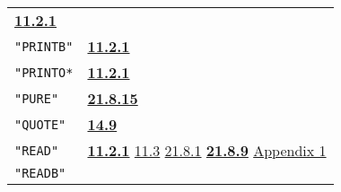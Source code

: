 \documentclass[a4paper,]{article}
\begin{document}
\begin{longtable}[]{@{}ll@{}}
\begin{minipage}[t]{0.70\columnwidth}
\textbf{\href{11-input-output.md\#1121-open}{11.2.1}}\strut
\end{minipage}\tabularnewline
\begin{minipage}[t]{0.24\columnwidth}\raggedright\strut
\texttt{"PRINTB"}\strut
\end{minipage} & \begin{minipage}[t]{0.70\columnwidth}\raggedright\strut
\textbf{\href{11-input-output.md\#1121-open}{11.2.1}}\strut
\end{minipage}\tabularnewline
\begin{minipage}[t]{0.24\columnwidth}\raggedright\strut
\texttt{"PRINTO*}\strut
\end{minipage} & \begin{minipage}[t]{0.70\columnwidth}\raggedright\strut
\textbf{\href{11-input-output.md\#1121-open}{11.2.1}}\strut
\end{minipage}\tabularnewline
\begin{minipage}[t]{0.24\columnwidth}\raggedright\strut
\texttt{"PURE"}\strut
\end{minipage} & \begin{minipage}[t]{0.70\columnwidth}\raggedright\strut
\textbf{\href{21-interrupts.md\#21815-dangerous-interrupts}{21.8.15}}\strut
\end{minipage}\tabularnewline
\begin{minipage}[t]{0.24\columnwidth}\raggedright\strut
\texttt{"QUOTE"}\strut
\end{minipage} & \begin{minipage}[t]{0.70\columnwidth}\raggedright\strut
\textbf{\href{14-data-type-declarations.md\#149-the-rsubr-decl}{14.9}}\strut
\end{minipage}\tabularnewline
\begin{minipage}[t]{0.24\columnwidth}\raggedright\strut
\texttt{"READ"}\strut
\end{minipage} & \begin{minipage}[t]{0.70\columnwidth}\raggedright\strut
\textbf{\href{11-input-output.md\#1121-open}{11.2.1}} \href{11-input-output.md\#113-end-of-file-routine}{11.3}
\href{21-interrupts.md\#2181-char-received}{21.8.1} \textbf{\href{21-interrupts.md\#2189-read-and-write}{21.8.9}}
\href{appendix-1-a-look-inside.md\#appendix-1-a-look-inside}{Appendix 1}\strut
\end{minipage}\tabularnewline
\begin{minipage}[t]{0.24\columnwidth}\raggedright\strut
\texttt{"READB"}\strut
\end{minipage} & \begin{minipage}[t]{0.70\columnwidth}\raggedright\strut

\end{minipage}
\end{longtable}
\end{document}
